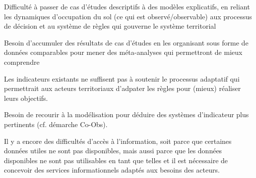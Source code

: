 \startitemize[n]

\item Difficulté à passer de cas d'études descriptifs
	à des modèles explicatifs, en reliant les dynamiques d'occupation du sol
	(ce qui est observé/observable) aux processus de décision et
	au système de règles qui gouverne le système territorial

\item Besoin d'accumuler des résultats de cas d'études
	en les organisant sous forme de données comparables
	pour mener des méta-analyses qui permettront de mieux comprendre

\item Les indicateurs existants ne suffisent pas à soutenir
	le processus adaptatif qui permettrait aux acteurs territoriaux
	d'adpater les règles pour (mieux) réaliser leurs objectifs.

	Besoin de recourir à la modélisation pour déduire
	des systèmes d'indicateur plus pertinents (cf. démarche Co-Obs).

\item Il y a encore des difficultés d'accès à l'information,
	soit parce que certaines données utiles ne sont pas disponibles,
	mais aussi parce que les données disponibles ne sont pas utilisables
	en tant que telles et il est nécessaire de concevoir
	des services informationnels adaptés aux besoins des acteurs.

\stopitemize